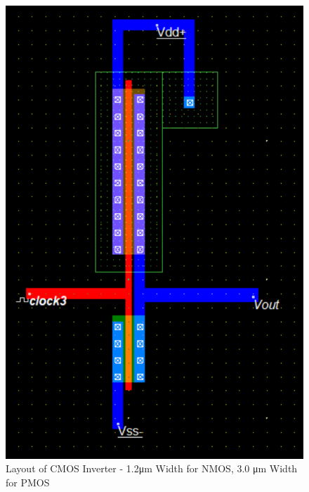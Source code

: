 \begin{figure}[h!]
	\centering
	\includegraphics[scale=0.75]{./images/inverter_12nmos30pmos.PNG}
	\caption{Layout of CMOS Inverter - 1.2\si{\micro\meter} Width for NMOS, 3.0 \si{\micro\meter} Width for PMOS}
	\label{fig:inverter_12nmos30pmos}
\end{figure}

\FloatBarrier

\FloatBarrier

